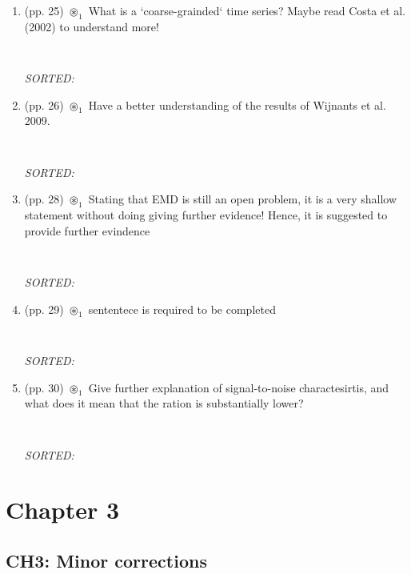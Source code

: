 \documentclass[12pt]{article}
\begin{document}
\begin{enumerate}
\item  (pp. 25) $\circledast_1$ 
	What is a `coarse-grainded` time series?
	Maybe read Costa et al. (2002) to understand more!
	\begin{verbatim}
	
	\end{verbatim}
	\textit{
	SORTED:  
	}
	\\


\item  (pp. 26) $\circledast_1$ 
	Have a better understanding of the results
	of Wijnants et al. 2009.
	\begin{verbatim}
	
	\end{verbatim}
	\textit{
	SORTED:  
	}
	\\

\item  (pp. 28) $\circledast_1$ 
	Stating that EMD is still an open problem,
	it is a very shallow statement without doing 
	giving further evidence! 
	Hence, it is suggested to provide further 
	evindence
	\begin{verbatim}
	
	\end{verbatim}
	\textit{
	SORTED:  
	}
	\\

\item  (pp. 29) $\circledast_1$ 
	sententece is required to be completed
	\begin{verbatim}
	
	\end{verbatim}
	\textit{
	SORTED:  
	}
	\\


\item  (pp. 30) $\circledast_1$ 
	Give further explanation of signal-to-noise charactesirtis,
	and what does it mean that the ration is substantially lower?
	\begin{verbatim}
	
	\end{verbatim}
	\textit{
	SORTED:  
	}
	\\

	
\end{enumerate}



\section{Chapter 3}

\subsection{CH3: Minor corrections}
\end{document}
